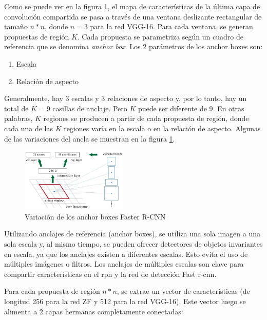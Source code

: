 Como se puede ver en la figura \ref{fig:variacion-anchor-boxes-faster-rcnn}, el mapa de características de la última capa de convolución compartida se pasa a través de una ventana deslizante rectangular de tamaño $n*n$, donde $n = 3$ para la red VGG-16. Para cada ventana, se generan propuestas de región $K$. Cada propuesta se parametriza según un cuadro de referencia que se denomina \textit{anchor box}. Los 2 parámetros de los anchor boxes son:

\begin{enumerate}
    \item Escala
    \item Relación de aspecto
\end{enumerate}

Generalmente, hay 3 escalas y 3 relaciones de aspecto y, por lo tanto, hay un total de $K = 9$ casillas de anclaje. Pero $K$ puede ser diferente de 9. En otras palabras, $K$ regiones se producen a partir de cada propuesta de región, donde cada una de las $K$ regiones varía en la escala o en la relación de aspecto. Algunas de las variaciones del ancla se muestran en la figura \ref{fig:variacion-anchor-boxes-faster-rcnn}.

\begin{figure}[ht]
\centering
\includegraphics[width=0.45\textwidth]{img/chapters/estado-del-arte/variacion-anchor-boxes-faster-rcnn.jpg}
\caption{\label{fig:variacion-anchor-boxes-faster-rcnn}Variación de los anchor boxes Faster R-CNN}
\end{figure}

Utilizando anclajes de referencia (anchor boxes), se utiliza una sola imagen a una sola escala y, al mismo tiempo, se pueden ofrecer detectores de objetos invariantes en escala, ya que los anclajes existen a diferentes escalas. Esto evita el uso de múltiples imágenes o filtros. Los anclajes de múltiples escalas son clave para compartir características en el \gls{rpn} y la red de detección Fast \gls{r-cnn}.

Para cada propuesta de región $n*n$, se extrae un vector de características (de longitud 256 para la red ZF y 512 para la red VGG-16). Este vector luego se alimenta a 2 capas hermanas completamente conectadas:

